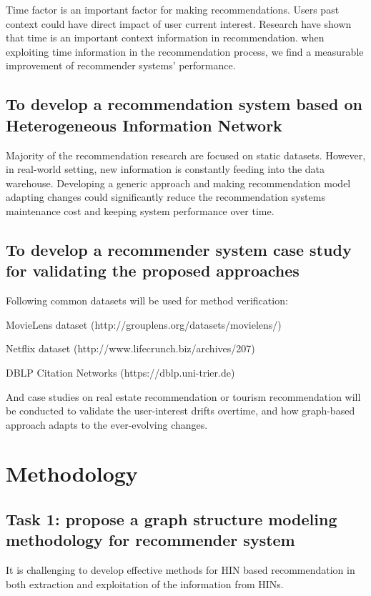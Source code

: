 \documentclass[12pt,a4 paper,title page]{article}
\begin{document}
Time factor is an important factor for making recommendations. Users past context could have direct impact of user current interest. Research have shown that time is an important context information in recommendation. when exploiting time information in the recommendation process, we find a measurable improvement of recommender systems’ performance. 

\subsection{To develop a recommendation system based on Heterogeneous Information Network} 

Majority of the recommendation research are focused on static datasets. However, in real-world setting, new information is constantly feeding into the data warehouse. Developing a generic approach and making recommendation model adapting changes could significantly reduce the recommendation systems maintenance cost and keeping system performance over time. 

\subsection{To develop a recommender system case study for validating the proposed approaches}

Following common datasets will be used for method verification: 

MovieLens dataset (http://grouplens.org/datasets/movielens/) 

Netflix dataset (http://www.lifecrunch.biz/archives/207) 

DBLP Citation Networks (https://dblp.uni-trier.de)  

And case studies on real estate recommendation or tourism recommendation will be conducted to validate the user-interest drifts overtime, and how graph-based approach adapts to the ever-evolving changes. 

\section{Methodology}


\subsection{Task 1: propose a graph structure modeling methodology for recommender system}
It is challenging to develop effective methods for HIN based recommendation in both extraction and exploitation of the information from HINs.
\end{document}
